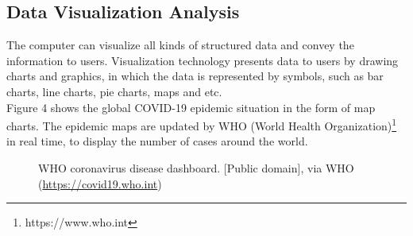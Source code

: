 \documentclass[sigplan,screen]{acmart}
\begin{document}
\subsection{Data Visualization Analysis}
The computer can visualize all kinds of structured data and convey the information to users.
Visualization technology presents data to users by drawing charts and graphics, in which the data is represented by symbols, such as bar charts, line charts, pie charts, maps and etc\cite{jensen1992harvard}.
\\
Figure 4 shows the global COVID-19 epidemic situation in the form of map charts. The epidemic maps are updated by WHO (World Health Organization)\footnote{https://www.who.int} in real time, to display the number of cases around the world.
\begin{figure}[htb]
	\centering
	\caption{WHO coronavirus disease dashboard. [Public domain], via WHO (\url{https://covid19.who.int})}
\end{figure}
\end{document}
